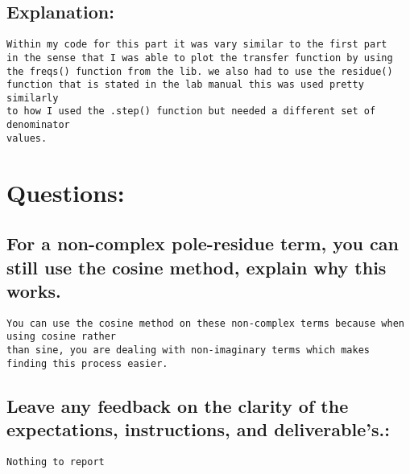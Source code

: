\documentclass{article}
\begin{document}
\subsection{Explanation:}

\begin{verbatim}
Within my code for this part it was vary similar to the first part 
in the sense that I was able to plot the transfer function by using 
the freqs() function from the lib. we also had to use the residue()
function that is stated in the lab manual this was used pretty similarly 
to how I used the .step() function but needed a different set of denominator
values. 
\end{verbatim}

\maketitle

\section{Questions:}

\subsection{For a non-complex pole-residue term, you can still use the cosine method, explain why this
works.}

\begin{verbatim}
You can use the cosine method on these non-complex terms because when using cosine rather
than sine, you are dealing with non-imaginary terms which makes finding this process easier. 
\end{verbatim}

\subsection{Leave any feedback on the clarity of the expectations, instructions, and deliverable's.:}

\begin{verbatim}
Nothing to report 
\end{verbatim}
\end{document}
